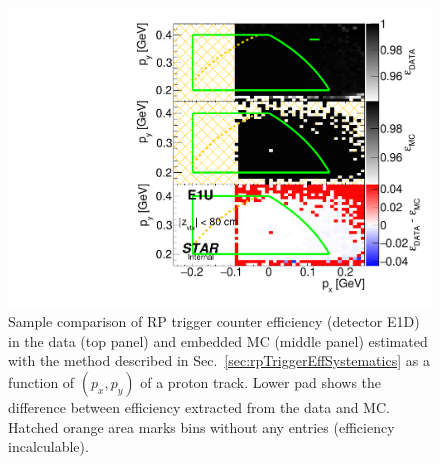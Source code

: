 \begin{figure}[h]%
	\centering
	\parbox{0.4725\textwidth}{
		\centering
		\includegraphics[width=\linewidth,page=3]{graphics/systematicsEfficiency/RpSyst/relativeTriggerEff2D_pxpy.pdf}%
	}
	\quad
	\parbox{0.4725\textwidth}{
		\centering\vspace*{-100pt}
		\caption[Coparison of estimated RP trigger counter efficiency in 2D (detector E1D).]%
    {Sample comparison of RP trigger counter efficiency (detector E1D) in the data (top panel) and embedded MC (middle panel) estimated with the method described in Sec.~\ref{sec:rpTriggerEffSystematics} as a function of $(p_{x},p_{y})$ of a proton track. Lower pad shows the difference between efficiency extracted from the data and MC. Hatched orange area marks bins without any entries (efficiency incalculable).%
    }
	}
	\label{fig:relativeRpRecoEff_E1D}
\end{figure}




